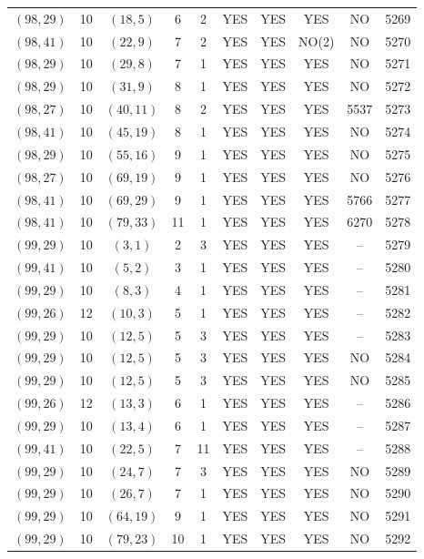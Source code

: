 \begin{longtable}{|c|c|c|c|c|c|c|c|c|c|}
$(98, 29)$ & 10 & $(18, 5)$ & 6 & 2 & YES & YES & YES & NO & 5269\\
$(98, 41)$ & 10 & $(22, 9)$ & 7 & 2 & YES & YES & NO(2) & NO & 5270\\
$(98, 29)$ & 10 & $(29, 8)$ & 7 & 1 & YES & YES & YES & NO & 5271\\
$(98, 29)$ & 10 & $(31, 9)$ & 8 & 1 & YES & YES & YES & NO & 5272\\
$(98, 27)$ & 10 & $(40, 11)$ & 8 & 2 & YES & YES & YES & 5537 & 5273\\
$(98, 41)$ & 10 & $(45, 19)$ & 8 & 1 & YES & YES & YES & NO & 5274\\
$(98, 29)$ & 10 & $(55, 16)$ & 9 & 1 & YES & YES & YES & NO & 5275\\
$(98, 27)$ & 10 & $(69, 19)$ & 9 & 1 & YES & YES & YES & NO & 5276\\
$(98, 41)$ & 10 & $(69, 29)$ & 9 & 1 & YES & YES & YES & 5766 & 5277\\
$(98, 41)$ & 10 & $(79, 33)$ & 11 & 1 & YES & YES & YES & 6270 & 5278\\
$(99, 29)$ & 10 & $(3, 1)$ & 2 & 3 & YES & YES & YES & -- & 5279\\
$(99, 41)$ & 10 & $(5, 2)$ & 3 & 1 & YES & YES & YES & -- & 5280\\
$(99, 29)$ & 10 & $(8, 3)$ & 4 & 1 & YES & YES & YES & -- & 5281\\
$(99, 26)$ & 12 & $(10, 3)$ & 5 & 1 & YES & YES & YES & -- & 5282\\
$(99, 29)$ & 10 & $(12, 5)$ & 5 & 3 & YES & YES & YES & -- & 5283\\
$(99, 29)$ & 10 & $(12, 5)$ & 5 & 3 & YES & YES & YES & NO & 5284\\
$(99, 29)$ & 10 & $(12, 5)$ & 5 & 3 & YES & YES & YES & NO & 5285\\
$(99, 26)$ & 12 & $(13, 3)$ & 6 & 1 & YES & YES & YES & -- & 5286\\
$(99, 29)$ & 10 & $(13, 4)$ & 6 & 1 & YES & YES & YES & -- & 5287\\
$(99, 41)$ & 10 & $(22, 5)$ & 7 & 11 & YES & YES & YES & -- & 5288\\
$(99, 29)$ & 10 & $(24, 7)$ & 7 & 3 & YES & YES & YES & NO & 5289\\
$(99, 29)$ & 10 & $(26, 7)$ & 7 & 1 & YES & YES & YES & NO & 5290\\
$(99, 29)$ & 10 & $(64, 19)$ & 9 & 1 & YES & YES & YES & NO & 5291\\
$(99, 29)$ & 10 & $(79, 23)$ & 10 & 1 & YES & YES & YES & NO & 5292\\

\end{longtable}
